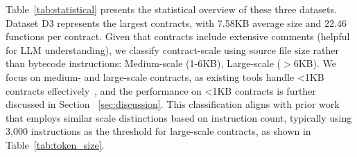 \documentclass[sigconf]{acmart}
\begin{document}
\begin{sloppypar}
%
Table~\ref{tab:statistical} presents the statistical overview of these three datasets. Dataset D3 represents the largest contracts, with 7.58KB average size and 22.46 functions per contract.
%
%
Given that contracts include extensive comments (helpful for LLM understanding), we classify contract-scale using source file size rather than bytecode instructions: Medium-scale (1-6KB), Large-scale ($>$6KB). 
%
We focus on medium- and large-scale contracts, as existing tools handle <1KB contracts effectively~\cite{jiang2018contractfuzzer,grieco2020echidna,ase2020smartbugs},
%
and the performance on <1KB contracts is further discussed in Section ~\ref{sec:discussion}.
This classification aligns with prior work~\cite{he2019learning,liu2023rethinking,qian2024mufuzz} that employs similar scale distinctions based on instruction count, typically using 3,000 instructions as the threshold for large-scale contracts, as shown in Table~\ref{tab:token_size}.




\end{sloppypar}
\end{document}
